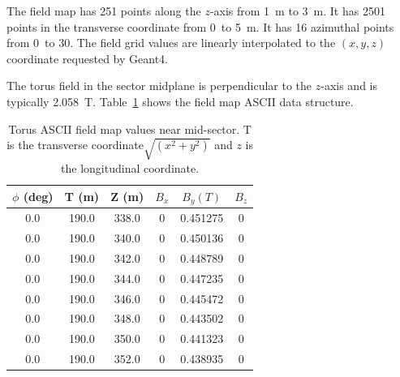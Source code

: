 The field map has 251 points along the $z$-axis from 1~m to 3~m. It has 2501 points in the transverse coordinate from
0~to 5~m. It has 16 azimuthal points from 0\mdeg \ to 30\mdeg. The field grid values are linearly interpolated to the
$(x,y,z)$ coordinate requested by Geant4.

The torus field in the sector midplane is perpendicular to the $z$-axis and is typically 2.058~T. Table~\ref{tab:torMap}
shows the field map ASCII data structure.

\begin{table}[h]
	\begin{center}
		\begin{tabular}{| c | c | c | c | c | c | }
		 \hline \hline
         $\phi$ (deg) & T (m)    & Z (m)    &  $B_x$  &    $B_y (T)$    & $B_z$\\
			\hline
          0.0         &  190.0   &  338.0   &  0       &     0.451275 &  0 \\
          0.0         &  190.0   &  340.0   &  0       &     0.450136 &  0 \\
          0.0         &  190.0   &  342.0   &  0       &     0.448789 &  0 \\
          0.0         &  190.0   &  344.0   &  0       &     0.447235 &  0 \\
          0.0         &  190.0   &  346.0   &  0       &     0.445472 &  0 \\
          0.0         &  190.0   &  348.0   &  0       &     0.443502 &  0 \\
          0.0         &  190.0   &  350.0   &  0       &     0.441323 &  0 \\
          0.0         &  190.0   &  352.0   &  0       &     0.438935 &  0 \\
		\hline \hline
		\end{tabular}
	\end{center}
	\caption{Torus ASCII field map values near mid-sector. T is the transverse coordinate$\sqrt{(x^2+y^2)}$ and
             $z$ is the longitudinal coordinate.}
 	\label{tab:torMap}
\end{table}


